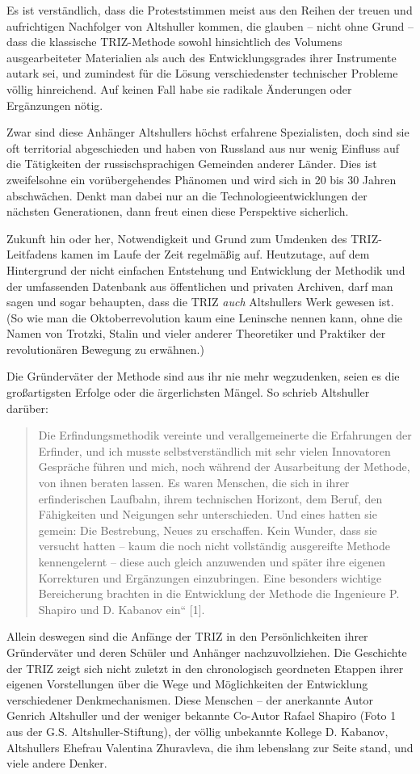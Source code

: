 \documentclass[11pt,a4paper]{article}
\begin{document}
Es ist verständlich, dass die Proteststimmen meist aus den Reihen der treuen
und aufrichtigen Nachfolger von Altshuller kommen, die glauben -- nicht ohne
Grund -- dass die klassische TRIZ-Methode sowohl hinsichtlich des Volumens
ausgearbeiteter Materialien als auch des Entwicklungsgrades ihrer Instrumente
autark sei, und zumindest für die Lösung verschiedenster technischer Probleme
völlig hinreichend. Auf keinen Fall habe sie radikale Änderungen oder
Ergänzungen nötig.

Zwar sind diese Anhänger Altshullers höchst erfahrene Spezialisten, doch sind
sie oft territorial abgeschieden und haben von Russland aus nur wenig Einfluss
auf die Tätigkeiten der russischsprachigen Gemeinden anderer Länder. Dies ist
zweifelsohne ein vorübergehendes Phänomen und wird sich in 20 bis 30 Jahren
abschwächen. Denkt man dabei nur an die Technologieentwicklungen der nächsten
Generationen, dann freut einen diese Perspektive sicherlich.

Zukunft hin oder her, Notwendigkeit und Grund zum Umdenken des TRIZ-Leitfadens
kamen im Laufe der Zeit regelmäßig auf. Heutzutage, auf dem Hintergrund der
nicht einfachen Entstehung und Entwicklung der Methodik und der umfassenden
Datenbank aus öffentlichen und privaten Archiven, darf man sagen und sogar
behaupten, dass die TRIZ \emph{auch} Altshullers Werk gewesen ist. (So wie man
die Oktoberrevolution kaum eine Leninsche nennen kann, ohne die Namen von
Trotzki, Stalin und vieler anderer Theoretiker und Praktiker der
revolutionären Bewegung zu erwähnen.)

Die Gründerväter der Methode sind aus ihr nie mehr wegzudenken, seien es die
großartigsten Erfolge oder die ärgerlichsten Mängel. So schrieb Altshuller
darüber:
\begin{quote}
  Die Erfindungsmethodik vereinte und verallgemeinerte die Erfahrungen der
  Erfinder, und ich musste selbstverständlich mit sehr vielen Innovatoren
  Gespräche führen und mich, noch während der Ausarbeitung der Methode, von
  ihnen beraten lassen. Es waren Menschen, die sich in ihrer erfinderischen
  Laufbahn, ihrem technischen Horizont, dem Beruf, den Fähigkeiten und
  Neigungen sehr unterschieden. Und eines hatten sie gemein: Die Bestrebung,
  Neues zu erschaffen. Kein Wunder, dass sie versucht hatten – kaum die noch
  nicht vollständig ausgereifte Methode kennengelernt – diese auch gleich
  anzuwenden und später ihre eigenen Korrekturen und Ergänzungen einzubringen.
  Eine besonders wichtige Bereicherung brachten in die Entwicklung der Methode
  die Ingenieure P. Shapiro und D. Kabanov ein“ [1].
\end{quote}
Allein deswegen sind die Anfänge der TRIZ in den Persönlichkeiten ihrer
Gründerväter und deren Schüler und Anhänger nachzuvollziehen. Die Geschichte
der TRIZ zeigt sich nicht zuletzt in den chronologisch geordneten Etappen
ihrer eigenen Vorstellungen über die Wege und Möglichkeiten der Entwicklung
verschiedener Denkmechanismen. Diese Menschen – der anerkannte Autor Genrich
Altshuller und der weniger bekannte Co-Autor Rafael Shapiro (Foto 1 aus der
G.S. Altshuller-Stiftung), der völlig unbekannte Kollege D. Kabanov,
Altshullers Ehefrau Valentina Zhuravleva, die ihm lebenslang zur Seite stand,
und viele andere Denker.
\end{document}
